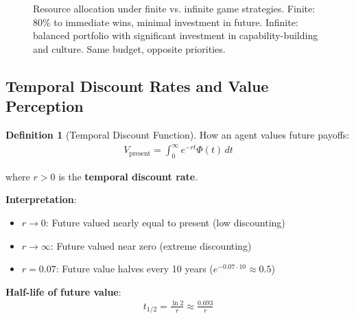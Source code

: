 \documentclass[11pt,a4paper]{article}
\theoremstyle{definition}
\newtheorem{definition}{Definition}[section]
\theoremstyle{remark}
\begin{document}
\begin{enumerate}
\begin{figure}[H]
\caption{Resource allocation under finite vs. infinite game strategies. Finite: 80\% to immediate wins, minimal investment in future. Infinite: balanced portfolio with significant investment in capability-building and culture. Same budget, opposite priorities.}
\label{fig:resource_allocation}
\end{figure}

\subsection{Temporal Discount Rates and Value Perception}

\begin{definition}[Temporal Discount Function]
How an agent values future payoffs:
\begin{align}
V_{\text{present}} = \int_0^\infty e^{-r t} \Phi(t) \, dt
\end{align}

where \(r > 0\) is the \textbf{temporal discount rate}.

\textbf{Interpretation}:
\begin{itemize}
    \item \(r \to 0\): Future valued nearly equal to present (low discounting)
    \item \(r \to \infty\): Future valued near zero (extreme discounting)
    \item \(r = 0.07\): Future value halves every 10 years (\(e^{-0.07 \cdot 10} \approx 0.5\))
\end{itemize}

\textbf{Half-life of future value}:
\begin{align}
t_{1/2} = \frac{\ln 2}{r} \approx \frac{0.693}{r}
\end{align}
\end{definition}


\end{enumerate}
\end{document}

